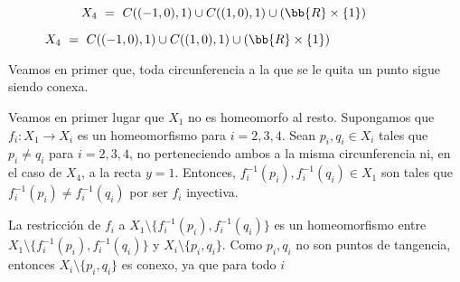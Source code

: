 \begin{ejercicio}
\begin{figure}[H]
\begin{subfigure}[c]{0.5\linewidth}
            \caption{\centering $X_4~=~C((-1, 0), 1) \cup C((1, 0), 1) \cup (\bb{R} \times \{1\}) $}
        \end{subfigure}
    \end{figure}

    Veamos en primer que, toda circunferencia a la que se le quita un punto sigue siendo conexa. 

    Veamos en primer lugar que $X_1$ no es homeomorfo al resto. Supongamos que $f_i:X_1\to X_i$ es un homeomorfismo para $i=2,3,4$.
    Sean $p_i,q_i\in X_i$ tales que $p_i\neq q_i$ para $i=2,3,4$, no perteneciendo ambos a la misma circunferencia ni, en el caso de $X_4$, a la recta $y=1$.
    Entonces, $f_i^{-1}(p_i),f_i^{-1}(q_i)\in X_1$ son tales que $f_i^{-1}(p_i)\neq f_i^{-1}(q_i)$ por ser $f_i$ inyectiva.

    La restricción de $f_i$ a $X_1\setminus \{f_i^{-1}(p_i), f_i^{-1}(q_i)\}$ es un homeomorfismo entre
    $X_1\setminus \{f_i^{-1}(p_i), f_i^{-1}(q_i)\}$ y $X_i\setminus \{p_i,q_i\}$. Como $p_i,q_i$ no son puntos de tangencia, entonces
    $X_i\setminus \{p_i,q_i\}$ es conexo, ya que para todo $i$ 
\end{ejercicio}

